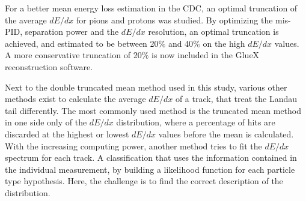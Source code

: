 For a better mean energy loss estimation in the CDC, an optimal truncation of the average $dE/dx$ for pions and protons was studied. By optimizing the mis-PID, separation power and the $dE/dx$ resolution, an optimal truncation is achieved, and estimated to be between 20$\%$ and 40$\%$ on the high $dE/dx$ values. A more conservative truncation of 20$\%$ is now included in the GlueX reconstruction software.
~\par Next to the double truncated mean method used in this study, various other methods exist to calculate the average $dE/dx$ of a track, that treat the Landau tail differently. The most commonly used method is the truncated mean method in one side only of the $dE/dx$ distribution, where a percentage of hits are discarded at the highest or lowest $dE/dx$ values before the mean is calculated. With the increasing computing power, another method tries to fit the $dE/dx$ spectrum for each track. A classification that uses the information contained in the individual measurement, by building a likelihood function for each particle type hypothesis. Here, the challenge is to find the correct description of the distribution.